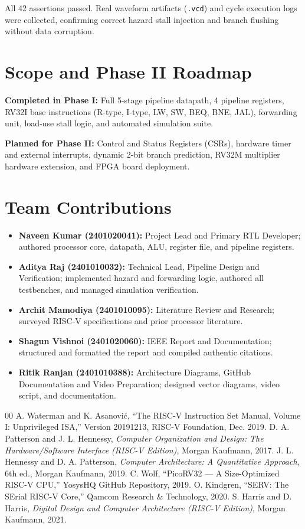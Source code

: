 \documentclass[conference]{IEEEtran}
\begin{document}
All 42 assertions passed. Real waveform artifacts (\texttt{.vcd}) and cycle execution logs were collected, confirming correct hazard stall injection and branch flushing without data corruption.

\section{Scope and Phase II Roadmap}
\textbf{Completed in Phase I:} Full 5-stage pipeline datapath, 4 pipeline registers, RV32I base instructions (R-type, I-type, LW, SW, BEQ, BNE, JAL), forwarding unit, load-use stall logic, and automated simulation suite.

\textbf{Planned for Phase II:} Control and Status Registers (CSRs), hardware timer and external interrupts, dynamic 2-bit branch prediction, RV32M multiplier hardware extension, and FPGA board deployment.

\section{Team Contributions}
\begin{itemize}
    \item \textbf{Naveen Kumar (2401020041):} Project Lead and Primary RTL Developer; authored processor core, datapath, ALU, register file, and pipeline registers.
    \item \textbf{Aditya Raj (2401010032):} Technical Lead, Pipeline Design and Verification; implemented hazard and forwarding logic, authored all testbenches, and managed simulation verification.
    \item \textbf{Archit Mamodiya (2401010095):} Literature Review and Research; surveyed RISC-V specifications and prior processor literature.
    \item \textbf{Shagun Vishnoi (2401020060):} IEEE Report and Documentation; structured and formatted the report and compiled authentic citations.
    \item \textbf{Ritik Ranjan (2401010388):} Architecture Diagrams, GitHub Documentation and Video Preparation; designed vector diagrams, video script, and documentation.
\end{itemize}

\begin{thebibliography}{00}
 A. Waterman and K. Asanovi\'c, ``The RISC-V Instruction Set Manual, Volume I: Unprivileged ISA,'' Version 20191213, RISC-V Foundation, Dec. 2019.
 D. A. Patterson and J. L. Hennessy, \textit{Computer Organization and Design: The Hardware/Software Interface (RISC-V Edition)}, Morgan Kaufmann, 2017.
 J. L. Hennessy and D. A. Patterson, \textit{Computer Architecture: A Quantitative Approach}, 6th ed., Morgan Kaufmann, 2019.
 C. Wolf, ``PicoRV32 --- A Size-Optimized RISC-V CPU,'' YosysHQ GitHub Repository, 2019.
 O. Kindgren, ``SERV: The SErial RISC-V Core,'' Qamcom Research \& Technology, 2020.
 S. Harris and D. Harris, \textit{Digital Design and Computer Architecture (RISC-V Edition)}, Morgan Kaufmann, 2021.
\end{thebibliography}
\end{document}
